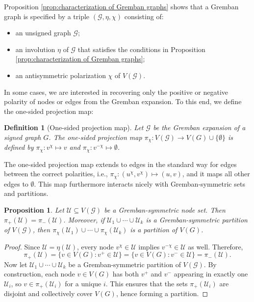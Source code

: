 \documentclass[reprint,onecolumn]{article}
\newtheorem{definition}[theorem]{Definition}  %
\newtheorem{proposition}[theorem]{Proposition}
\newcommand{\1}{\mathbb{1}}
\newcommand{\0}{\mathbf{0}}
\begin{document}
Proposition \ref{prop:characterization of Gremban graphs} shows that a Gremban graph is specified by a triple $(\mathcal{G},\eta,\chi)$ consisting of:
\begin{itemize}
    \item an unsigned graph $\mathcal{G}$;
    \item an involution $\eta$ of $\mathcal{G}$ that satisfies the conditions in Proposition \ref{prop:characterization of Gremban graphs};
    \item an antisymmetric polarization $\chi$ of $V(\mathcal{G})$.
\end{itemize}

In some cases, we are interested in recovering only the positive or negative polarity of nodes or edges from the Gremban expansion. To this end, we define the one-sided projection map:  
\begin{definition}[One-sided projection map]  \label{def:one_sided_projection}
    Let \( \mathcal{G} \) be the Gremban expansion of a signed graph \( G \). The \emph{one-sided projection map} \( \pi_\chi : V(\mathcal{G}) \to V(G) \cup \{ \emptyset \} \) is defined by $\pi_{\chi}:v^{\chi}\mapsto v$ and $\pi_{\chi}:v^{-\chi}\mapsto \emptyset$.
\end{definition}
The one-sided projection map extends to edges in the standard way for edges between the correct polarities, i.e., $\pi_{\chi}:(u^\chi,v^\chi)\mapsto(u,v)$, and it maps all other edges to $\emptyset$. This map furthermore interacts nicely with Gremban-symmetric sets and partitions.

\begin{proposition} \label{prop:one_sided_projection}
Let \( \mathcal{U} \subseteq V(\mathcal{G}) \) be a Gremban-symmetric node set. Then \( \pi_+(\mathcal{U}) = \pi_-(\mathcal{U}) \). Moreover, if $\mathcal{U}_1\cup\cdots\cup\mathcal{U}_k$ is a Gremban-symmetric partition of $V(\mathcal{G})$, then $\pi_\chi(\mathcal{U}_1)\cup\cdots\cup\pi_{\chi}(\mathcal{U}_k)$ is a partition of $V(G)$.
\end{proposition}
\begin{proof}
Since \( \mathcal{U} = \eta(\mathcal{U}) \), every node \( v^\chi \in \mathcal{U} \) implies \( v^{-\chi} \in \mathcal{U} \) as well. Therefore,
\[
\pi_+(\mathcal{U}) = \{ v \in V(G) : v^+ \in \mathcal{U} \} = \{ v \in V(G) : v^- \in \mathcal{U} \} = \pi_-(\mathcal{U}).
\]
Now let $\mathcal{U}_1\cup\cdots\cup\mathcal{U}_k$ be a Gremban-symmetric partition of \( V(\mathcal{G}) \). By construction, each node \( v \in V(G) \) has both \( v^+ \) and \( v^- \) appearing in exactly one \( \mathcal{U}_i \), so \( v \in \pi_+(\mathcal{U}_i) \) for a unique \( i \). This ensures that the sets \( \pi_+(\mathcal{U}_i) \) are disjoint and collectively cover \( V(G) \), hence forming a partition.
\end{proof}
%
\end{document}
